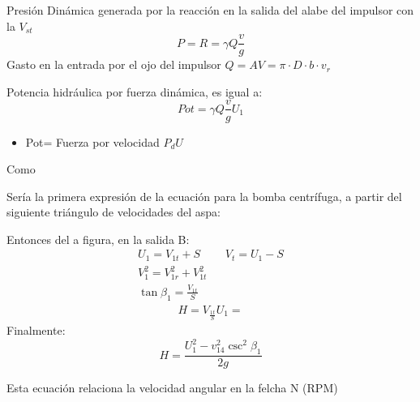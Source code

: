 Presión Dinámica generada por la reacción en la salida del alabe del impulsor con la $V_{st}$
\begin{equation}
    P = R = \gamma Q \frac{v}{g}
\end{equation}
Gasto en la entrada por el ojo del impulsor $Q=AV=\pi\cdot D\cdot b\cdot v_r$

Potencia hidráulica por fuerza dinámica, es igual a:
\begin{equation}
    Pot = \gamma Q \frac{v}{g} U_1
\end{equation}
\begin{notation}
    \begin{itemize}
        \item Pot= Fuerza por velocidad $P_dU$
    \end{itemize}
\end{notation}
Como



Sería la primera expresión de la ecuación para la bomba centrífuga, a partir del siguiente triángulo de velocidades del aspa:


Entonces del a figura, en la salida B:
\begin{align*}
    U_1 = V_{1t} + S&& V_t = U_1 - S\\
    V_1^2 = V_{1r}^2 + V_{1t}^2\\
    \tan{\beta_1} = \frac{V_{1t}}{S} &&
\end{align*}
\begin{align*}
    H = V_\frac{1t}{S}U_1 =
\end{align*}
Finalmente:
\begin{equation}
    H = \frac{U_1^2 - v_{14}^2 \csc^2{\beta_1} }{2g}
\end{equation}

Esta ecuación relaciona la velocidad angular en la felcha N (RPM)

